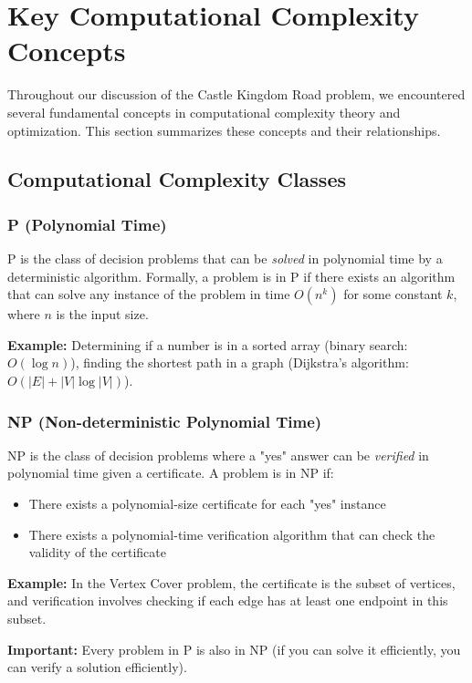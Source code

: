 \section{Key Computational Complexity Concepts}

Throughout our discussion of the Castle Kingdom Road problem, we encountered several fundamental concepts in computational complexity theory and optimization. This section summarizes these concepts and their relationships.

\subsection{Computational Complexity Classes}

\subsubsection{P (Polynomial Time)}
P is the class of decision problems that can be \textit{solved} in polynomial time by a deterministic algorithm. Formally, a problem is in P if there exists an algorithm that can solve any instance of the problem in time $O(n^k)$ for some constant $k$, where $n$ is the input size.

\textbf{Example:} Determining if a number is in a sorted array (binary search: $O(\log n)$), finding the shortest path in a graph (Dijkstra's algorithm: $O(|E| + |V| \log |V|)$).

\subsubsection{NP (Non-deterministic Polynomial Time)}
NP is the class of decision problems where a "yes" answer can be \textit{verified} in polynomial time given a certificate. A problem is in NP if:
\begin{itemize}
    \item There exists a polynomial-size certificate for each "yes" instance
    \item There exists a polynomial-time verification algorithm that can check the validity of the certificate
\end{itemize}

\textbf{Example:} In the Vertex Cover problem, the certificate is the subset of vertices, and verification involves checking if each edge has at least one endpoint in this subset.

\textbf{Important:} Every problem in P is also in NP (if you can solve it efficiently, you can verify a solution efficiently).

